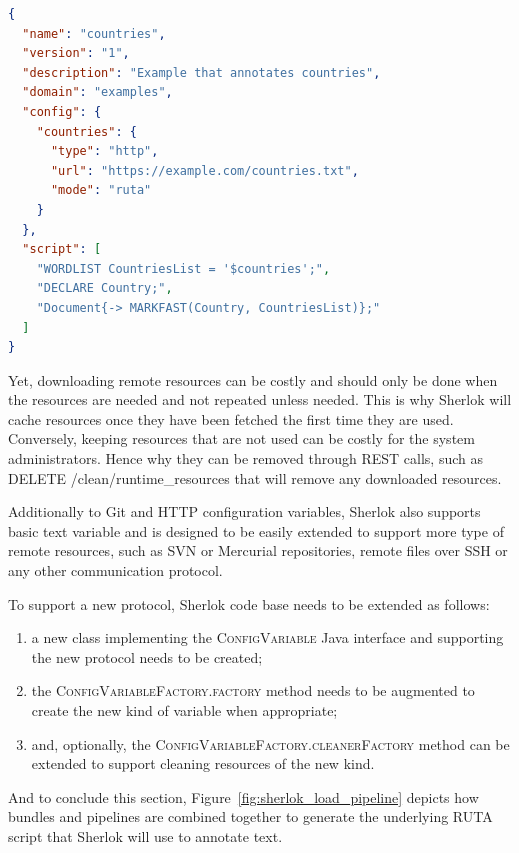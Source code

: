 \documentclass{article}
\newcommand{\ID}[1]{{\textsc{#1}}}
\newcommand{\REST}[1]{\textsf{#1}}
\begin{document}
\begin{lstlisting}[float,language=json,
                   caption=Configuration of the \ID{countries} pipeline,
                   label=lst:countries_pipeline_config]
{
  "name": "countries",
  "version": "1",
  "description": "Example that annotates countries",
  "domain": "examples",
  "config": {
    "countries": {
      "type": "http",
      "url": "https://example.com/countries.txt",
      "mode": "ruta"
    }
  },
  "script": [
    "WORDLIST CountriesList = '$countries';",
    "DECLARE Country;",
    "Document{-> MARKFAST(Country, CountriesList)};"
  ]
}
\end{lstlisting}

Yet, downloading remote resources can be costly and should only be done when the resources are
needed and not repeated unless needed. This is why Sherlok will cache resources once they have been
fetched the first time they are used. Conversely, keeping resources that are not used can be costly
for the system administrators. Hence why they can be removed through REST calls, such as \REST{DELETE
/clean/runtime\_resources} that will remove any downloaded resources.

Additionally to Git and HTTP configuration variables, Sherlok also supports basic text variable and
is designed to be easily extended to support more type of remote resources, such as SVN or Mercurial
repositories, remote files over SSH or any other communication protocol.

To support a new protocol, Sherlok code base needs to be extended as follows:

\begin{enumerate}
    \item a new class implementing the \ID{ConfigVariable} Java interface and supporting the new
        protocol needs to be created;
    \item the \ID{ConfigVariableFactory.factory} method needs to be augmented to create the new kind of
        variable when appropriate;
    \item and, optionally, the \ID{ConfigVariableFactory.cleanerFactory} method can be extended to
        support cleaning resources of the new kind.
\end{enumerate}

And to conclude this section, Figure~\ref{fig:sherlok_load_pipeline} depicts how bundles and pipelines
are combined together to generate the underlying RUTA script that Sherlok will use to annotate text.
\end{document}
